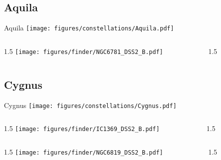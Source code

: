 \documentclass[final]{beamer}
\newlength{\colwidth}
\begin{document}
\subsection{Aquila}

\begin{frame}[t]{\LARGE Aquila}
  \centering
  \texttt{[image: figures/constellations/Aquila.pdf]}
\end{frame}


\begin{frame}[t]{}
  \begin{columns}[T]
    \begin{column}{1.5\colwidth}
      \centering
      \texttt{[image: figures/finder/NGC6781\_DSS2\_B.pdf]}
    \end{column}
    \begin{column}{1.5\colwidth}
      \Large
      
    \end{column}
  \end{columns}
  \vspace{\fill}
\end{frame}

\subsection{Cygnus}

\begin{frame}[t]{\LARGE Cygnus}
  \centering
  \texttt{[image: figures/constellations/Cygnus.pdf]}
\end{frame}


\begin{frame}[t]{}
  \begin{columns}[T]
    \begin{column}{1.5\colwidth}
      \centering
      \texttt{[image: figures/finder/IC1369\_DSS2\_B.pdf]}
    \end{column}
    \begin{column}{1.5\colwidth}
      \Large
      
    \end{column}
  \end{columns}
  \vspace{\fill}
  \begin{columns}[T]
    \begin{column}{1.5\colwidth}
      \centering
      \texttt{[image: figures/finder/NGC6819\_DSS2\_B.pdf]}
    \end{column}
    \begin{column}{1.5\colwidth}
      \Large
      
    \end{column}
  \end{columns}
\end{frame}
\end{document}
